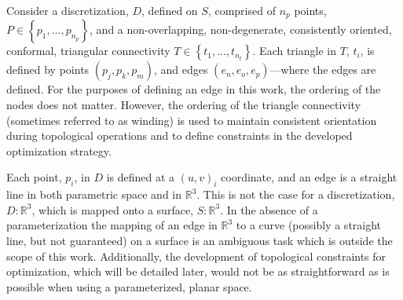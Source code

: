 Consider a discretization, $D$, defined on $S$, comprised of $n_p$
points, $P \in \left\{p_1,...,p_{n_p} \right\}$, and a non-overlapping,
non-degenerate, consistently oriented, conformal, triangular
connectivity $T \in \left\{t_1,...,t_{n_t} \right\}$. Each triangle in
$T$, $t_i$, is defined by points $\left(p_j, p_k, p_m\right)$, and edges
$\left(e_n, e_o, e_p\right)$---where the edges are defined. For the purposes of
defining an edge in this work, the ordering of the nodes does not matter.
However, the ordering of the triangle connectivity (sometimes referred to as
winding) is used to maintain consistent orientation during topological
operations and to define constraints in the developed optimization strategy.

Each point, $p_i$, in $D$ is defined at a $\left(u,v\right)_i$
coordinate, and an edge is a straight line in both parametric space and in
${\mathbb R}^3$. This is not the case for a discretization, $D:{\mathbb
R}^3$, which is mapped onto a surface, $S:{\mathbb R}^3$. In the absence
of a parameterization the mapping of an edge in ${\mathbb R}^3$ to a
curve (possibly a straight line, but not guaranteed) on a surface is an
ambiguous task which is outside the scope of this work. Additionally,
the development of topological constraints for optimization, which will
be detailed later, would not be as straightforward as is possible when
using a parameterized, planar space.
